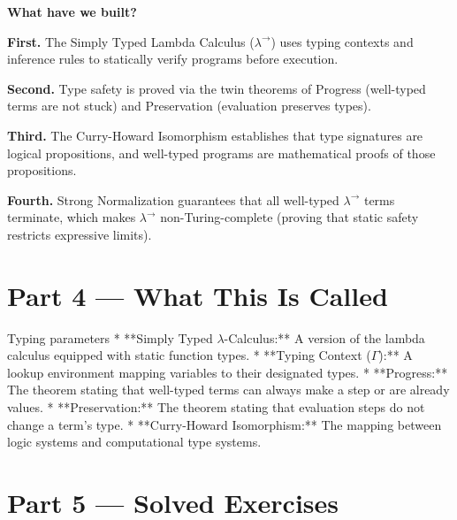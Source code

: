 \documentclass[12pt, a4paper]{book}
\begin{document}
\begin{discoverybox}
\textbf{What have we built?}

\textbf{First.} The Simply Typed Lambda Calculus ($\lambda^\to$) uses typing contexts and inference rules to statically verify programs before execution.

\textbf{Second.} Type safety is proved via the twin theorems of Progress (well-typed terms are not stuck) and Preservation (evaluation preserves types).

\textbf{Third.} The Curry-Howard Isomorphism establishes that type signatures are logical propositions, and well-typed programs are mathematical proofs of those propositions.

\textbf{Fourth.} Strong Normalization guarantees that all well-typed $\lambda^\to$ terms terminate, which makes $\lambda^\to$ non-Turing-complete (proving that static safety restricts expressive limits).
\end{discoverybox}

\newpage

\section{Part 4 --- What This Is Called}

\begin{namedconcept}{Typing parameters}
* **Simply Typed $\lambda$-Calculus:** A version of the lambda calculus equipped with static function types.
* **Typing Context ($\Gamma$):** A lookup environment mapping variables to their designated types.
* **Progress:** The theorem stating that well-typed terms can always make a step or are already values.
* **Preservation:** The theorem stating that evaluation steps do not change a term's type.
* **Curry-Howard Isomorphism:** The mapping between logic systems and computational type systems.
\end{namedconcept}

\newpage

\section{Part 5 --- Solved Exercises}
\end{document}
